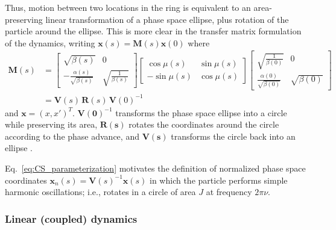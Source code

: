 Thus, motion between two locations in the ring is equivalent to an area-preserving linear transformation of a phase space ellipse, plus rotation of the particle around the ellipse. This is more clear in the transfer matrix formulation of the dynamics, writing $\mathbf{x}(s) = \mathbf{M}(s)\mathbf{x}(0)$ where
%
\begin{equation} \label{eq:CS_parameterization}
\begin{aligned}
    \mathbf{M}(s) &= 
    \begin{bmatrix} 
        \sqrt{\beta(s)} & 0 \\
        -\frac{\alpha(s)}{\sqrt{\beta(s)}} & \sqrt{\frac{1}{\beta(s)}}
    \end{bmatrix}
    \begin{bmatrix} 
        \cos\mu(s) & \sin\mu(s) 
        \\ -\sin\mu(s) & \cos\mu(s) 
    \end{bmatrix}
    \begin{bmatrix} 
        \sqrt{\frac{1}{\beta(0)}} & 0 \\
        \frac{\alpha(0)}{\sqrt{\beta(0)}} & \sqrt{\beta(0)}
    \end{bmatrix} \\
    &= \mathbf{V}(s) \, \mathbf{R}(s) \, \mathbf{V}(0)^{-1} 
\end{aligned}
\end{equation}
%
and $\mathbf{x} = (x, x')^T$. $\mathbf{V(0)}^{-1}$ transforms the phase space ellipse into a circle while preserving its area, $\mathbf{R(s)}$ rotates the coordinates around the circle according to the phase advance, and $\mathbf{V(s)}$ transforms the circle back into an ellipse \cite{Lee2011}. 

Eq.~\eqref{eq:CS_parameterization} motivates the definition of normalized phase space coordinates $\mathbf{x}_n(s) = \mathbf{V}(s)^{-1} \mathbf{x}(s)$ in which the particle performs simple harmonic oscillations; i.e., rotates in a circle of area $J$ at frequency $2\pi\nu$. 




\subsubsection{Linear (coupled) dynamics}


